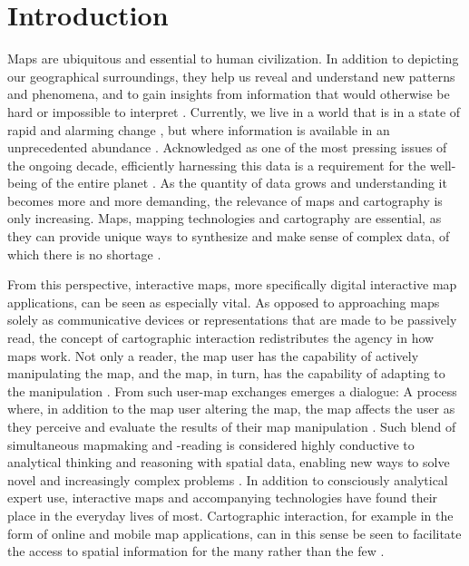 \section{Introduction}



Maps are ubiquitous and essential to human civilization.
In addition to depicting our geographical surroundings,
they help us reveal and understand new patterns and phenomena,
and to gain insights from information
that would otherwise be hard or impossible to interpret \parencite{mac2004}.
Currently, we live in a world that is in a state of rapid and
alarming change \parencite{un2023},
but where information is available in an unprecedented abundance
\parencite{rob2017a, un2023}.
Acknowledged as one of the most pressing issues of the ongoing decade,
efficiently harnessing this data is a requirement
for the well-being of the entire planet \parencite{un2020}.
As the quantity of data grows
and understanding it becomes more and more demanding,
the relevance of maps and cartography is only increasing.
Maps, mapping technologies and cartography are essential,
as they can provide unique ways to synthesize and make sense of complex data,
of which there is no shortage \parencite{kra2021}.

From this perspective,
interactive maps, more specifically digital interactive map applications,
can be seen as especially vital.
As opposed to approaching maps solely as communicative devices or representations
that are made to be passively read,
the concept of cartographic interaction redistributes the agency in how maps work.
Not only a reader, the map user has the capability of actively manipulating the map,
and the map, in turn, has the capability of adapting to the manipulation \parencite{eds2008}.
From such user-map exchanges emerges a dialogue:
A process where, in addition to the map user altering the map,
the map affects the user as they perceive and evaluate the results of their map manipulation
\parencite{rot2011}.
Such blend of simultaneous mapmaking and -reading
is considered highly conductive to analytical thinking and reasoning
with spatial data,
enabling new ways to solve novel and increasingly complex problems
\parencite{rob2017b, and2010}.
In addition to consciously analytical expert use,
interactive maps and accompanying technologies have found their place
in the everyday lives of most.
Cartographic interaction, for example in the form of online and mobile map applications,
can in this sense be seen to facilitate the access to spatial information
for the many rather than the few \parencite{mei2019}.

